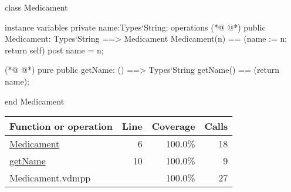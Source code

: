 \begin{vdmpp}[breaklines=true]
class Medicament

instance variables
  private name:Types`String;
operations
(*@
\label{Medicament:6}
@*)
 public Medicament: Types`String ==> Medicament
  Medicament(n) == (name := n; return self)
 post name = n;
 
(*@
\label{getName:10}
@*)
 pure public getName: () ==> Types`String
  getName() == (return name);

end Medicament
\end{vdmpp}
\bigskip
\begin{longtable}{|l|r|r|r|}
\hline
Function or operation & Line & Coverage & Calls \\
\hline
\hline
\hyperref[Medicament:6]{Medicament} & 6&100.0\% & 18 \\
\hline
\hyperref[getName:10]{getName} & 10&100.0\% & 9 \\
\hline
\hline
Medicament.vdmpp & & 100.0\% & 27 \\
\hline
\end{longtable}

